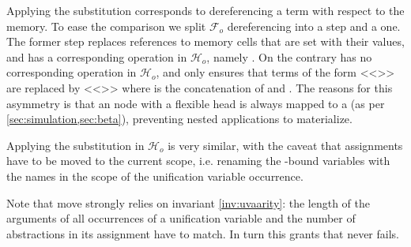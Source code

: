 \documentclass[sigconf,natbib=false,review]{acmart}
\newcommand{\Fo}{\ensuremath{\mathcal{F}_{\!o}\xspace}} %
\newcommand{\Ho}{\ensuremath{\mathcal{H}_o}\xspace}
\begin{document}


Applying the substitution corresponds to dereferencing a term with respect to
the memory. To ease the comparison we split \Fo{} dereferencing into a
 step and a  one. The former step replaces references
to memory cells that are set with their values, and has a corresponding
operation in \Ho, namely . On the contrary 
has no corresponding operation in \Ho, and only ensures that
terms of the form <<>> are replaced by
<<>> where  is the concatenation of 
and . The reasons for this asymmetry is
that an  node with a flexible head is always mapped
to a  (as per \cref{sec:simulation,sec:beta}),
preventing nested applications to materialize.



\noindent
Applying the substitution in \Ho{} is very similar, with
the caveat that assignments have to be moved to the
current scope, i.e. renaming the -bound variables
with the names in the scope of the unification variable occurrence.



\noindent
Note that move strongly relies on invariant \ref{inv:uvaarity}: the length
of the arguments of all occurrences of a unification variable and the
number of abstractions in its assignment have to match. In turn
this grants that  never fails.
\end{document}
